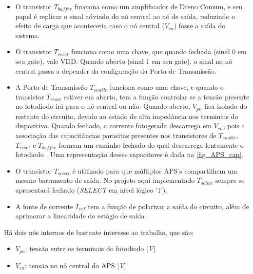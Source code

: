 \begin{itemize}

    \item O transistor $T_{buffer}$ funciona como um amplificador de Dreno Comum, e seu papel \'e replicar o sinal advindo do n\'o central ao n\'o de sa\'ida, reduzindo o efeito de carga que aconteceria caso o n\'o central ($V_{cn}$) fosse a saída do sistema.

    \item O transistor $T_{reset}$ funciona como uma chave, que quando fechada (sinal 0 em seu gate), vale VDD. Quando aberto (sinal 1 em seu gate), o sinal no n\'o central passa a depender da configuração da Porta de Transmissão.

    \item A Porta de Transmissão $T_{enable}$ funciona como uma chave, e quando o transistor $T_{reset}$ estiver em aberto, tem a função controlar se a tensão presente no fotodiodo ir\'a para o nó central ou não. Quando aberto, $V_{pn}$ fica isolado do restante do circuito, devido ao estado de alta imped\^ancia nos terminais do dispositivo. Quando fechado, a corrente fotogerada descarrega em $V_{cn}$, pois a associação das capacitâncias parasitas presentes nos transistores de $T_{enable}$, $T_{reset}$ e $T_{buffer}$ formam um caminho fechado do qual descarrega lentamente o fotodiodo \cite{LidianeCampos}. Uma representação desses capacitores \'e dada na \autoref{fig_APS_cap}.
    
    \item O transistor $T_{select}$ \'e utilizado para que m\'ultiplos APS's compartilhem um mesmo barramento de sa\'ida. No projeto aqui implementado $T_{select}$ sempre se apresentar\'a fechado (\textit{SELECT} em n\'ivel l\'ogico '1').
    
    \item A fonte de corrente \textit{$I_{ref}$} tem a função de polarizar a sa\'ida do circuito, além de aprimorar a linearidade do estágio de sa\'ida \cite{RazaviFundM}.

\end{itemize}

    H\'a dois n\'os internos de bastante interesse ao trabalho, que são:

\begin{itemize}
    \item \textit{$V_{pn}$}: tensão entre os terminais do fotodiodo [\textit{V}]
    \item \textit{$V_{cn}$}: tensão no n\'o central do APS [\textit{V}]
\end{itemize}

